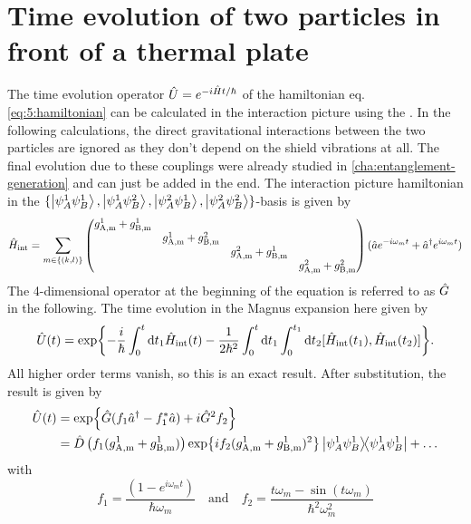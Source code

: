 \section{Time evolution of two particles in front of a thermal plate}\label{apx:thermal-shield-time-evolution}
The time evolution operator $\hat{U}=e^{-i\hat{H}t/\hbar}$ of the hamiltonian eq. \eqref{eq:5:hamiltonian} can be calculated in the interaction picture using the  \cite{Blanes_2009}.
In the following calculations, the direct gravitational interactions between the two particles are ignored as they don't depend on the shield vibrations at all. The final evolution due to these couplings were already studied in \cref{cha:entanglement-generation} and can just be added in the end. 
The interaction picture hamiltonian in the $\{\ket{\psi^1_A\psi^1_B},\ket{\psi^1_A\psi^2_B},\ket{\psi^2_A\psi^1_B},\ket{\psi^2_A\psi^2_B}\}$-basis is given by
\begin{equation}
  \hat{H}_\mathrm{int} = \sum_{m\in\{(k,l)\}} \begin{pmatrix}
    g^1_\mathrm{A,m} + g^1_\mathrm{B,m}& & & \\
    & g^1_\mathrm{A,m} + g^2_\mathrm{B,m}& & \\
    & & g^2_\mathrm{A,m} + g^1_\mathrm{B,m}& \\
    & & & g^2_\mathrm{A,m} + g^2_\mathrm{B,m}
  \end{pmatrix}(\hat{a}e^{-i\omega_m t}+\hat{a}^\dagger e^{i\omega_m t})
\end{equation}
The 4-dimensional operator at the beginning of the equation is referred to as $\hat{G}$ in the following.
The time evolution in the Magnus expansion here given by \cite{Blanes_2009}
\begin{equation}
  \hat{U}(t) = \exp{-\frac{i}{\hbar}\int_{0}^{t}\dd t_1 \hat{H}_\mathrm{int}(t)-\frac{1}{2\hbar^2}\int_{0}^{t}\dd t_1 \int_{0}^{t_1}\dd t_2 [\hat{H}_\mathrm{int}(t_1),\hat{H}_\mathrm{int}(t_2)]} .
\end{equation}
All higher order terms vanish, so this is an exact result.
After substitution, the result is given by
\begin{align}
  \hat{U}(t) &= \exp{\hat{G}(f_1\hat{a}^\dagger - f_1^*\hat{a}) + i \hat{G}^2 f_2} \\ 
  &= \hat{D}\left(f_1(g^1_\mathrm{A,m} + g^1_\mathrm{B,m})\right) \exp{i f_2 (g^1_\mathrm{A,m} + g^1_\mathrm{B,m})^2} \ketbra{\psi^1_A\psi^1_B} + \dots
\end{align}
with
\begin{equation}
  f_1 = \frac{(1-e^{i\omega_m t})}{\hbar \omega_m}
  \quad \text{and} \quad
  f_2 = \frac{t\omega_m - \sin(t \omega_m)}{\hbar^2 \omega_m^2}
\end{equation}
